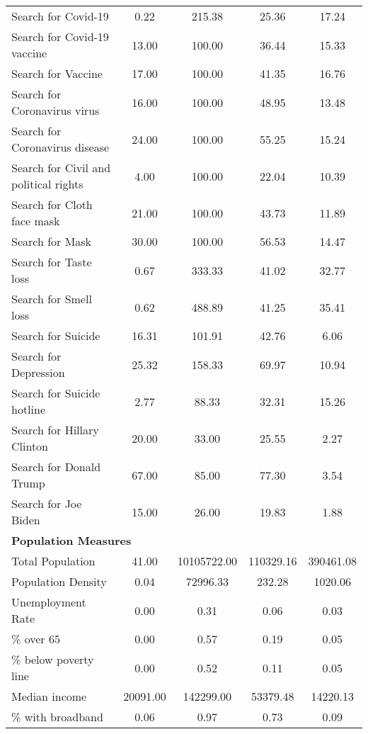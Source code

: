 \begin{table}[!h]
\begin{tabular}{lcccc}
Search for Covid-19 & \num{0.22} & \num{215.38} & \num{25.36} & \num{17.24}\\
Search for Covid-19 vaccine & \num{13.00} & \num{100.00} & \num{36.44} & \num{15.33}\\
Search for Vaccine & \num{17.00} & \num{100.00} & \num{41.35} & \num{16.76}\\
Search for Coronavirus virus & \num{16.00} & \num{100.00} & \num{48.95} & \num{13.48}\\
Search for Coronavirus disease & \num{24.00} & \num{100.00} & \num{55.25} & \num{15.24}\\
Search for Civil and political rights & \num{4.00} & \num{100.00} & \num{22.04} & \num{10.39}\\
Search for Cloth face mask & \num{21.00} & \num{100.00} & \num{43.73} & \num{11.89}\\
Search for Mask & \num{30.00} & \num{100.00} & \num{56.53} & \num{14.47}\\
Search for Taste loss & \num{0.67} & \num{333.33} & \num{41.02} & \num{32.77}\\
Search for Smell loss & \num{0.62} & \num{488.89} & \num{41.25} & \num{35.41}\\
Search for Suicide & \num{16.31} & \num{101.91} & \num{42.76} & \num{6.06}\\
Search for Depression & \num{25.32} & \num{158.33} & \num{69.97} & \num{10.94}\\
Search for Suicide hotline & \num{2.77} & \num{88.33} & \num{32.31} & \num{15.26}\\
Search for Hillary Clinton & \num{20.00} & \num{33.00} & \num{25.55} & \num{2.27}\\
Search for Donald Trump & \num{67.00} & \num{85.00} & \num{77.30} & \num{3.54}\\
Search for Joe Biden & \num{15.00} & \num{26.00} & \num{19.83} & \num{1.88}\\

\multicolumn{4}{l}{\textbf{Population Measures}} \\\hline

Total Population & \num{41.00} & \num{10105722.00} & \num{110329.16} & \num{390461.08}\\
Population Density & \num{0.04} & \num{72996.33} & \num{232.28} & \num{1020.06}\\
Unemployment Rate & \num{0.00} & \num{0.31} & \num{0.06} & \num{0.03}\\
\% over 65 & \num{0.00} & \num{0.57} & \num{0.19} & \num{0.05}\\
\% below poverty line & \num{0.00} & \num{0.52} & \num{0.11} & \num{0.05}\\
Median income & \num{20091.00} & \num{142299.00} & \num{53379.48} & \num{14220.13}\\
\% with broadband & \num{0.06} & \num{0.97} & \num{0.73} & \num{0.09}\\
\bottomrule
\end{tabular}
\end{table}
